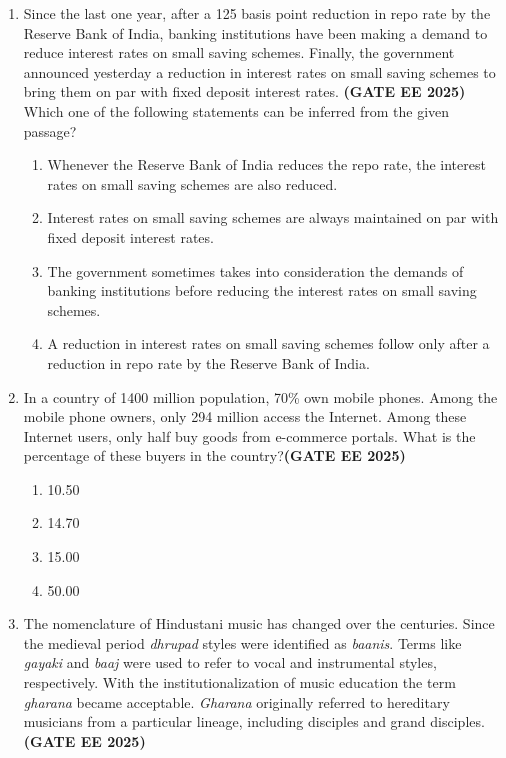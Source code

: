 \documentclass[journal,12pt,onecolumn]{IEEEtran}
\theoremstyle{remark}
\begin{document}
\begin{enumerate}
\item Since the last one year, after a 125 basis point reduction in repo rate by the Reserve Bank of India, banking institutions have been making a demand to reduce interest rates on small saving schemes. Finally, the government announced yesterday a reduction in interest rates on small saving schemes to bring them on par with fixed deposit interest rates.  
\hfill \textbf{(GATE EE 2025)}\\
Which one of the following statements can be inferred from the given passage?

\begin{enumerate} 
    \item Whenever the Reserve Bank of India reduces the repo rate, the interest rates on small saving schemes are also reduced.
    \item Interest rates on small saving schemes are always maintained on par with fixed deposit interest rates.
    \item The government sometimes takes into consideration the demands of banking institutions before reducing the interest rates on small saving schemes.
    \item A reduction in interest rates on small saving schemes follow only after a reduction in repo rate by the Reserve Bank of India.
\end{enumerate}

\item In a country of 1400 million population, 70\% own mobile phones. Among the mobile phone owners, only 294 million access the Internet. Among these Internet users, only half buy goods from e-commerce portals. What is the percentage of these buyers in the country?\hfill \textbf{(GATE EE 2025)}\\

\begin{enumerate} 
    \item 10.50
    \item 14.70
    \item 15.00
    \item 50.00
\end{enumerate}

\item The nomenclature of Hindustani music has changed over the centuries. Since the medieval period \textit{dhrupad} styles were identified as \textit{baanis}. Terms like \textit{gayaki} and \textit{baaj} were used to refer to vocal and instrumental styles, respectively. With the institutionalization of music education the term \textit{gharana} became acceptable. \textit{Gharana} originally referred to hereditary musicians from a particular lineage, including disciples and grand disciples. \hfill \textbf{(GATE EE 2025)}\\


\end{enumerate}
\end{document}
